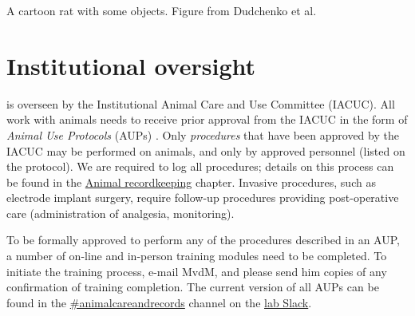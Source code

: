 \documentclass{tufte-book}
\begin{document}
\begin{marginfigure}
\caption{A cartoon rat with some objects. Figure from Dudchenko et al.}
\label{fig:rat-with-objects}
\end{marginfigure}

\section{Institutional oversight}

 is overseen by the
Institutional Animal Care and Use Committee (IACUC). All work with
animals needs to receive prior approval from the IACUC in the form of
{\it Animal Use Protocols} (AUPs) . Only {\it procedures} that
have been approved by the IACUC may be performed on animals, and only
by approved personnel (listed on the protocol). We are required to log
all procedures; details on this process can be found in the
\hyperref[ch:animal-management]{Animal recordkeeping}
chapter. Invasive procedures, such as electrode implant surgery,
require follow-up procedures providing post-operative care
(administration of analgesia, monitoring).

To be formally approved to perform any of the procedures described in
an AUP, a number of on-line and in-person training modules need to be
completed. To initiate the training process, e-mail MvdM, and please
send him copies of any confirmation of training completion. The
current version of all AUPs can be found in the
\url{#animalcareandrecords} channel on the
\href{http://mvdmlab.slack.com}{lab Slack}.
\end{document}
